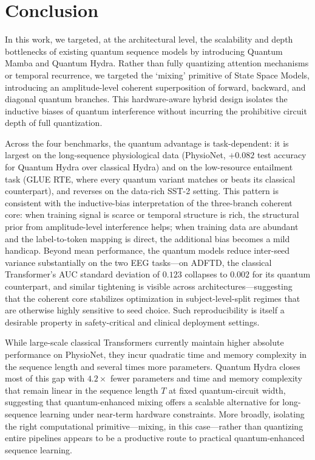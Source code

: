 \documentclass[conference]{IEEEtran}
\begin{document}
\section{Conclusion}
In this work, we targeted, at the architectural level, the scalability and depth bottlenecks of existing quantum sequence models by introducing Quantum Mamba and Quantum Hydra. Rather than fully quantizing attention mechanisms or temporal recurrence, we targeted the `mixing' primitive of State Space Models, introducing an amplitude-level coherent superposition of forward, backward, and diagonal quantum branches. This hardware-aware hybrid design isolates the inductive biases of quantum interference without incurring the prohibitive circuit depth of full quantization.

Across the four benchmarks, the quantum advantage is task-dependent: it is largest on the long-sequence physiological data (PhysioNet, $+0.082$ test accuracy for Quantum Hydra over classical Hydra) and on the low-resource entailment task (GLUE RTE, where every quantum variant matches or beats its classical counterpart), and reverses on the data-rich SST-2 setting. This pattern is consistent with the inductive-bias interpretation of the three-branch coherent core: when training signal is scarce or temporal structure is rich, the structural prior from amplitude-level interference helps; when training data are abundant and the label-to-token mapping is direct, the additional bias becomes a mild handicap. Beyond mean performance, the quantum models reduce inter-seed variance substantially on the two EEG tasks—on ADFTD, the classical Transformer's AUC standard deviation of $0.123$ collapses to $0.002$ for its quantum counterpart, and similar tightening is visible across architectures—suggesting that the coherent core stabilizes optimization in subject-level-split regimes that are otherwise highly sensitive to seed choice. Such reproducibility is itself a desirable property in safety-critical and clinical deployment settings.

While large-scale classical Transformers currently maintain higher absolute performance on PhysioNet, they incur quadratic time and memory complexity in the sequence length and several times more parameters. Quantum Hydra closes most of this gap with $4.2\times$ fewer parameters and time and memory complexity that remain linear in the sequence length $T$ at fixed quantum-circuit width, suggesting that quantum-enhanced mixing offers a scalable alternative for long-sequence learning under near-term hardware constraints. More broadly, isolating the right computational primitive—mixing, in this case—rather than quantizing entire pipelines appears to be a productive route to practical quantum-enhanced sequence learning.
\end{document}
